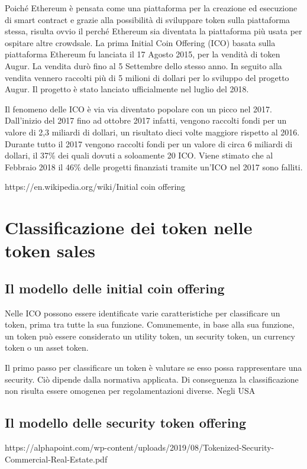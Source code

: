 Poiché Ethereum è pensata come una piattaforma per la creazione ed esecuzione di smart contract e grazie alla possibilità di sviluppare token sulla piattaforma stessa, risulta ovvio il perché Ethereum sia diventata la piattaforma più usata per ospitare altre crowdsale. La prima Initial Coin Offering (ICO) basata sulla piattaforma Ethereum fu lanciata il 17 Agosto 2015, per la vendità di token Augur. La vendita durò fino al 5 Settembre dello stesso anno. In seguito alla vendita vennero raccolti più di 5 milioni di dollari per lo sviluppo del progetto Augur. Il progetto è stato lanciato ufficialmente nel luglio del 2018. 

Il fenomeno delle ICO è via via diventato popolare con un picco nel 2017. Dall'inizio  del 2017 fino ad ottobre 2017 infatti,  vengono raccolti fondi per un valore di 2,3 miliardi di dollari, un risultato dieci volte maggiore rispetto al 2016. 
Durante tutto il 2017 vengono raccolti fondi per un valore di circa 6 miliardi di dollari, il 37\% dei quali dovuti a soloamente 20 ICO. 
Viene stimato che al Febbraio 2018 il 46\% delle progetti finanziati tramite un'ICO nel 2017 sono falliti. 
 
https://en.wikipedia.org/wiki/Initial coin offering

\section{Classificazione dei token nelle token sales}
\subsection{Il modello delle initial coin offering}
Nelle ICO possono essere identificate varie caratteristiche per classificare un token, prima tra tutte la sua funzione. Comunemente, in base alla sua funzione, un token può essere considerato un utility token, un security token, un currency token o un asset token. 

Il primo passo per classificare un token è valutare se esso possa rappresentare una security. Ciò dipende dalla normativa applicata. Di conseguenza la classificazione non risulta essere omogenea per regolamentazioni diverse. Negli USA 

\subsection{Il modello delle security token offering}

https://alphapoint.com/wp-content/uploads/2019/08/Tokenized-Security-Commercial-Real-Estate.pdf
